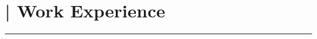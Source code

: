 \section{\textcolor{gold}{\faBriefcase}| Work Experience}
\noindent\color{blue}\rule{12.5cm}{0.4pt}







%

%